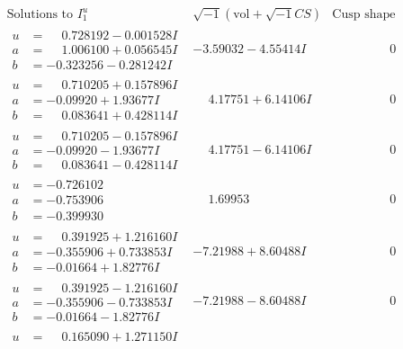 \documentclass[1p]{elsarticle_modified}
\theoremstyle{definition}
\newcommand{\I}{\sqrt{-1}}
\begin{document}
$$\begin{array}{c|c|c}
\text{Solutions to }I^u_{1}& \I (\text{vol} + \sqrt{-1}CS) & \text{Cusp shape}\\
 \hline 
\begin{aligned}
u &= \phantom{-}0.728192 - 0.001528 I \\
a &= \phantom{-}1.006100 + 0.056545 I \\
b &= -0.323256 - 0.281242 I\end{aligned}
 & -3.59032 - 4.55414 I & \phantom{-0.000000 } 0 \\ \hline\begin{aligned}
u &= \phantom{-}0.710205 + 0.157896 I \\
a &= -0.09920 + 1.93677 I \\
b &= \phantom{-}0.083641 + 0.428114 I\end{aligned}
 & \phantom{-}4.17751 + 6.14106 I & \phantom{-0.000000 } 0 \\ \hline\begin{aligned}
u &= \phantom{-}0.710205 - 0.157896 I \\
a &= -0.09920 - 1.93677 I \\
b &= \phantom{-}0.083641 - 0.428114 I\end{aligned}
 & \phantom{-}4.17751 - 6.14106 I & \phantom{-0.000000 } 0 \\ \hline\begin{aligned}
u &= -0.726102\phantom{ +0.000000I} \\
a &= -0.753906\phantom{ +0.000000I} \\
b &= -0.399930\phantom{ +0.000000I}\end{aligned}
 & \phantom{-}1.69953\phantom{ +0.000000I} & \phantom{-0.000000 } 0 \\ \hline\begin{aligned}
u &= \phantom{-}0.391925 + 1.216160 I \\
a &= -0.355906 + 0.733853 I \\
b &= -0.01664 + 1.82776 I\end{aligned}
 & -7.21988 + 8.60488 I & \phantom{-0.000000 } 0 \\ \hline\begin{aligned}
u &= \phantom{-}0.391925 - 1.216160 I \\
a &= -0.355906 - 0.733853 I \\
b &= -0.01664 - 1.82776 I\end{aligned}
 & -7.21988 - 8.60488 I & \phantom{-0.000000 } 0 \\ \hline\begin{aligned}
u &= \phantom{-}0.165090 + 1.271150 I \\

\end{aligned}
\end{array}$$
\end{document}
